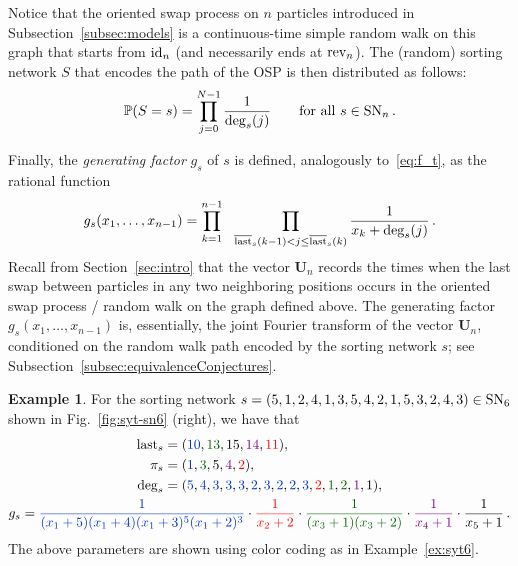 \documentclass[a4paper,reqno,12pt]{amsart}
\theoremstyle{plain}
\theoremstyle{definition}
\newtheorem{ex}[thm]{Example}
\newcommand{\firstmention}{\emph}
\newcommand{\sort}{\textnormal{SN}}
\newcommand{\rev}{\textnormal{rev}}
\newcommand{\id}{\textnormal{id}}
\newcommand{\fin}{\textnormal{last}}
\newcommand{\finsorted}{\overline{\fin}}
\renewcommand{\P}{\mathbb{P}}
\newcommand{\1}{\mathbbm{1}}
\begin{document}
Notice that the oriented swap process on $n$ particles introduced in Subsection~\ref{subsec:models} is a continuous-time simple random walk on this graph that starts from $\id_n$ (and necessarily ends at $\rev_n$).
The (random) sorting network $S$ that encodes the path of the OSP is then distributed as follows:
\begin{equation}
\label{eq:deg_s}
\P(\nobreak{S=s}) = \prod_{j=0}^{N-1} \frac{1}{\deg_s(j)}
\qquad
\text{for all } s\in\sort_n \, .
\end{equation}

Finally, the \firstmention{generating factor} $g_s$ of $s$ is defined, analogously to~\eqref{eq:f_t}, as the rational function
\begin{equation}
g_s(x_1,\ldots,x_{n-1}) = \prod_{k=1}^{n-1} \ \ \prod_{\finsorted_s(k-1) < j \le \finsorted_s(k)} \frac{1}{x_k + \deg_s(j)} \, .
\label{eq:g_s}
\end{equation}
Recall from Section~\ref{sec:intro} that the vector $\bm{U}_n$ records the times when the last swap between particles in any two neighboring positions occurs in the oriented swap process / random walk on the graph defined above.
The generating factor $g_s(x_1,\dots,x_{n-1})$ is, essentially, the joint Fourier transform of the vector $\bm{U}_n$, conditioned on the random walk path encoded by the sorting network $s$; see Subsection~\ref{subsec:equivalenceConjectures}.

\begin{ex} 
\label{ex:sortingnet6}
For the sorting network $s = (5, 1, 2, 4, 1, 3, 5, 4, 2, 1, 5, 3, 2, 4, 3) \in \sort_6$ shown in Fig.~\ref{fig:syt-sn6} (right), we have that
\begin{gather*}
\begin{aligned}
\fin_s &
= ({{\color{colorone}10}, {\color{colorthree}13}, {\color{colorfive}15}, {\color{colorfour}14}, {\color{colortwo}11}}),\\
\pi_s &= ({{\color{colorone}1}, {\color{colorthree}3}, {\color{colorfive}5}, {\color{colorfour}4}, {\color{colortwo}2}}),\\
\deg_s
 &= ({{\color{colorone}5}, {\color{colorone}4}, {\color{colorone}3}, {\color{colorone}3}, {\color{colorone}3}, {\color{colorone}2}, {\color{colorone}3}, {\color{colorone}2}, {\color{colorone}2}, {\color{colorone}3}, {\color{colortwo}2}, {\color{colorthree}1}, {\color{colorthree}2}, {\color{colorfour}1}, {\color{colorfive}1}}),
 \end{aligned} \\
g_s = 
{\color{colorone}\frac{1}{(x_{1}+{5})(x_{1}+{4})(x_{1}+{3})^5(x_{1}+{2})^3}} \cdot
{\color{colortwo}\frac{1}{x_{2}+{2}}} \cdot
{\color{colorthree}\frac{1}{(x_{3}+{1})(x_{3}+{2})}} \cdot
{\color{colorfour}\frac{1}{x_{4}+{1}}} \cdot
{\color{colorfive}\frac{1}{x_{5}+{1}}} \, .
 \end{gather*}
The above parameters are shown using color coding as in Example~\ref{ex:syt6}.
\end{ex}
\end{document}
